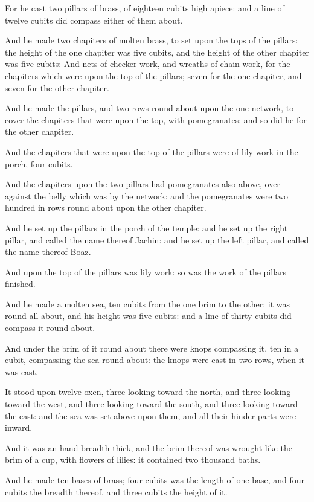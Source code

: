 \verse For he cast two pillars of brass, of eighteen cubits high apiece: and a line of twelve cubits did compass either of them about.

\verse And he made two chapiters of molten brass, to set upon the tops of the pillars: the height of the one chapiter was five cubits, and the height of the other chapiter was five cubits: \verse And nets of checker work, and wreaths of chain work, for the chapiters which were upon the top of the pillars; seven for the one chapiter, and seven for the other chapiter.

\verse And he made the pillars, and two rows round about upon the one network, to cover the chapiters that were upon the top, with pomegranates: and so did he for the other chapiter.

\verse And the chapiters that were upon the top of the pillars were of lily work in the porch, four cubits.

\verse And the chapiters upon the two pillars had pomegranates also above, over against the belly which was by the network: and the pomegranates were two hundred in rows round about upon the other chapiter.

\verse And he set up the pillars in the porch of the temple: and he set up the right pillar, and called the name thereof Jachin: and he set up the left pillar, and called the name thereof Boaz.

\verse And upon the top of the pillars was lily work: so was the work of the pillars finished.

\verse And he made a molten sea, ten cubits from the one brim to the other: it was round all about, and his height was five cubits: and a line of thirty cubits did compass it round about.

\verse And under the brim of it round about there were knops compassing it, ten in a cubit, compassing the sea round about: the knops were cast in two rows, when it was cast.

\verse It stood upon twelve oxen, three looking toward the north, and three looking toward the west, and three looking toward the south, and three looking toward the east: and the sea was set above upon them, and all their hinder parts were inward.

\verse And it was an hand breadth thick, and the brim thereof was wrought like the brim of a cup, with flowers of lilies: it contained two thousand baths.

\verse And he made ten bases of brass; four cubits was the length of one base, and four cubits the breadth thereof, and three cubits the height of it.

